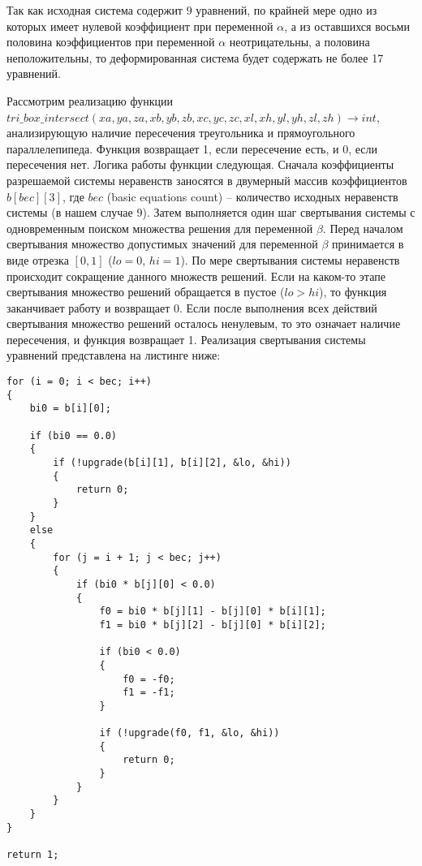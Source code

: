 \documentclass[
11pt,%
tightenlines,%
twoside,%
onecolumn,%
nofloats,%
nobibnotes,%
nofootinbib,%
superscriptaddress,%
noshowpacs,%
centertags]%
{revtex4}
\begin{document}
Так как исходная система содержит 9 уравнений, по крайней мере одно из которых имеет нулевой коэффициент при переменной $\alpha$, а из оставшихся восьми половина коэффициентов при переменной $\alpha$ неотрицательны, а половина неположительны, то деформированная система будет содержать не более 17 уравнений.

Рассмотрим реализацию функции \\
$tri\_box\_intersect(xa, ya, za, xb, yb, zb, xc, yc, zc, xl, xh, yl, yh, zl, zh) \rightarrow int$, анализирующую наличие пересечения треугольника и прямоугольного параллелепипеда.
Функция возвращает 1, если пересечение есть, и 0, если пересечения нет.
Логика работы функции следующая.
Сначала коэффициенты разрешаемой системы неравенств заносятся в двумерный массив коэффициентов $b[bec][3]$, где $bec$ (basic equations count) -- количество исходных неравенств системы (в нашем случае 9).
Затем выполняется один шаг свертывания системы с одновременным поиском множества решения для переменной $\beta$.
Перед началом свертывания множество допустимых значений для переменной $\beta$ принимается в виде отрезка $[0, 1]$ ($lo = 0$, $hi = 1$).
По мере свертывания системы неравенств происходит сокращение данного множеств решений.
Если на каком-то  этапе свертывания множество решений обращается в пустое ($lo > hi$), то функция заканчивает работу и возвращает 0.
Если после выполнения всех действий свертывания множество решений осталось ненулевым, то это означает наличие пересечения, и функция возвращает 1.
Реализация свертывания системы уравнений представлена на листинге ниже:

\begin{lstlisting}[caption={Исходная реализация свертывания системы линейных неравенств для определения пересечения треугольника и прямоугольного параллелепипеда.},label={lst:prac_intersect_1}]
for (i = 0; i < bec; i++)
{
    bi0 = b[i][0];

    if (bi0 == 0.0)
    {
        if (!upgrade(b[i][1], b[i][2], &lo, &hi))
        {
            return 0;
        }
    }
    else
    {
        for (j = i + 1; j < bec; j++)
        {
            if (bi0 * b[j][0] < 0.0)
            {
                f0 = bi0 * b[j][1] - b[j][0] * b[i][1];
                f1 = bi0 * b[j][2] - b[j][0] * b[i][2];

                if (bi0 < 0.0)
                {
                    f0 = -f0;
                    f1 = -f1;
                }

                if (!upgrade(f0, f1, &lo, &hi))
                {
                    return 0;
                }
            }
        }
    }
}

return 1;
\end{lstlisting}
\end{document}
